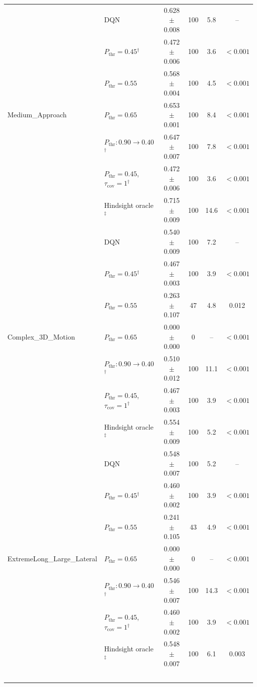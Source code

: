 \begin{table}[htbp]
\begin{tabular}{llcccc}
\midrule
\multirow{7}{*}{Medium\_Approach} & DQN & 0.628 $\pm$ 0.008 & 100 & 5.8 & -- \\
 & $P_{\mathrm{thr}}=0.45$$^{\dagger}$ & 0.472 $\pm$ 0.006 & 100 & 3.6 & $<0.001$ \\
 & $P_{\mathrm{thr}}=0.55$ & 0.568 $\pm$ 0.004 & 100 & 4.5 & $<0.001$ \\
 & $P_{\mathrm{thr}}=0.65$ & 0.653 $\pm$ 0.001 & 100 & 8.4 & $<0.001$ \\
 & $P_{\mathrm{thr}}: 0.90 \to 0.40$$^{\dagger}$ & 0.647 $\pm$ 0.007 & 100 & 7.8 & $<0.001$ \\
 & $P_{\mathrm{thr}}=0.45$, $\tau_{\mathrm{cov}}=1$$^{\dagger}$ & 0.472 $\pm$ 0.006 & 100 & 3.6 & $<0.001$ \\
 & Hindsight oracle$^{\ddagger}$ & 0.715 $\pm$ 0.009 & 100 & 14.6 & $<0.001$ \\
\midrule
\multirow{7}{*}{Complex\_3D\_Motion} & DQN & 0.540 $\pm$ 0.009 & 100 & 7.2 & -- \\
 & $P_{\mathrm{thr}}=0.45$$^{\dagger}$ & 0.467 $\pm$ 0.003 & 100 & 3.9 & $<0.001$ \\
 & $P_{\mathrm{thr}}=0.55$ & 0.263 $\pm$ 0.107 & 47 & 4.8 & 0.012 \\
 & $P_{\mathrm{thr}}=0.65$ & 0.000 $\pm$ 0.000 & 0 & -- & $<0.001$ \\
 & $P_{\mathrm{thr}}: 0.90 \to 0.40$$^{\dagger}$ & 0.510 $\pm$ 0.012 & 100 & 11.1 & $<0.001$ \\
 & $P_{\mathrm{thr}}=0.45$, $\tau_{\mathrm{cov}}=1$$^{\dagger}$ & 0.467 $\pm$ 0.003 & 100 & 3.9 & $<0.001$ \\
 & Hindsight oracle$^{\ddagger}$ & 0.554 $\pm$ 0.009 & 100 & 5.2 & $<0.001$ \\
\midrule
\multirow{7}{*}{ExtremeLong\_Large\_Lateral} & DQN & 0.548 $\pm$ 0.007 & 100 & 5.2 & -- \\
 & $P_{\mathrm{thr}}=0.45$$^{\dagger}$ & 0.460 $\pm$ 0.002 & 100 & 3.9 & $<0.001$ \\
 & $P_{\mathrm{thr}}=0.55$ & 0.241 $\pm$ 0.105 & 43 & 4.9 & $<0.001$ \\
 & $P_{\mathrm{thr}}=0.65$ & 0.000 $\pm$ 0.000 & 0 & -- & $<0.001$ \\
 & $P_{\mathrm{thr}}: 0.90 \to 0.40$$^{\dagger}$ & 0.546 $\pm$ 0.007 & 100 & 14.3 & $<0.001$ \\
 & $P_{\mathrm{thr}}=0.45$, $\tau_{\mathrm{cov}}=1$$^{\dagger}$ & 0.460 $\pm$ 0.002 & 100 & 3.9 & $<0.001$ \\
 & Hindsight oracle$^{\ddagger}$ & 0.548 $\pm$ 0.007 & 100 & 6.1 & 0.003 \\
$$
\end{tabular}
\end{table}
